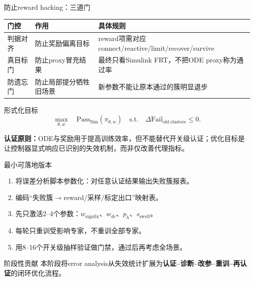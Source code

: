 \documentclass[10pt,aspectratio=169,mathserif]{beamer}
\begin{document}
\begin{frame}{防止reward hacking：三道门}
\begin{table}
\centering\small
\begin{tabular}{lll}
\toprule
门控 & 作用 & 具体规则 \\
\midrule
判据对齐 & 防止奖励偏离目标 & reward项需对应connect/reactive/limit/recover/survive \\
真目标门 & 防止proxy冒充结果 & 最终只看Simulink FRT，不把ODE proxy称为通过率 \\
防遗忘门 & 防止局部提分牺牲旧场景 & 新参数不能让原本通过的簇明显退步 \\
\bottomrule
\end{tabular}
\end{table}

\begin{block}{形式化目标}
\[
\max_{\theta,w}\quad
\mathrm{Pass}_{\mathrm{Sim}}(\pi_{\theta,w})
\quad
\mathrm{s.t.}\quad
\Delta \mathrm{Fail}_{\mathrm{old\ clusters}}\le 0.
\]
\end{block}

\medskip
\textbf{认证原则：}ODE与奖励用于提高训练效率，但不能替代开关级认证；优化目标是让控制器显式响应已识别的失效机制，而非仅改善代理指标。
\end{frame}

\begin{frame}{最小可落地版本}
\begin{enumerate}
  \item 将误差分析脚本参数化：对任意认证结果输出失败簇报表。
  \item 编码“失败簇$\rightarrow$reward/采样/标定出口”映射表。
  \item 先只激活2--4个参数：$w_{\mathrm{signfix}}$、$w_{dc}$、$p_h$、$s_{\mathrm{swell}}$。
  \item 每轮只重训受影响专家，不重训全部专家。
  \item 用8--16个开关级抽样验证做门禁，通过后再考虑全场景。
\end{enumerate}

\begin{block}{阶段性贡献}
本阶段将error analysis从失效统计扩展为\textbf{认证--诊断--改参--重训--再认证}的闭环优化流程。
\end{block}
\end{frame}
\end{document}

